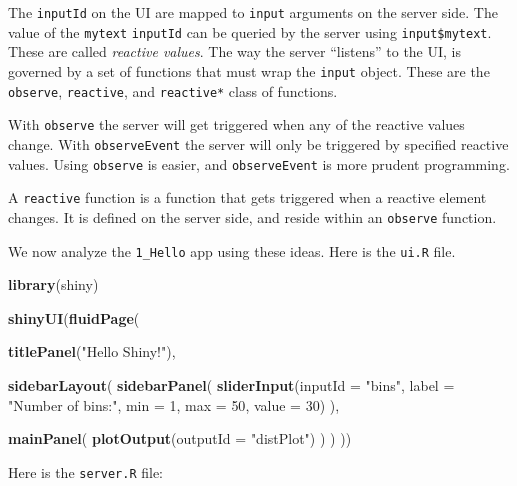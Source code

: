 \documentclass[]{book}
\newenvironment{Shaded}{\begin{snugshade}}{\end{snugshade}}
\newcommand{\DataTypeTok}[1]{\textcolor[rgb]{0.13,0.29,0.53}{#1}}
\newcommand{\DecValTok}[1]{\textcolor[rgb]{0.00,0.00,0.81}{#1}}
\newcommand{\KeywordTok}[1]{\textcolor[rgb]{0.13,0.29,0.53}{\textbf{#1}}}
\newcommand{\NormalTok}[1]{#1}
\newcommand{\StringTok}[1]{\textcolor[rgb]{0.31,0.60,0.02}{#1}}
\theoremstyle{definition}
\theoremstyle{definition}
\theoremstyle{definition}
\theoremstyle{remark}
\begin{document}
The \texttt{inputId} on the UI are mapped to \texttt{input} arguments on the server side.
The value of the \texttt{mytext} \texttt{inputId} can be queried by the server using \texttt{input\$mytext}.
These are called \emph{reactive values}.
The way the server ``listens'' to the UI, is governed by a set of functions that must wrap the \texttt{input} object.
These are the \texttt{observe}, \texttt{reactive}, and \texttt{reactive*} class of functions.

With \texttt{observe} the server will get triggered when any of the reactive values change.
With \texttt{observeEvent} the server will only be triggered by specified reactive values.
Using \texttt{observe} is easier, and \texttt{observeEvent} is more prudent programming.

A \texttt{reactive} function is a function that gets triggered when a reactive element changes.
It is defined on the server side, and reside within an \texttt{observe} function.

We now analyze the \texttt{1\_Hello} app using these ideas.
Here is the \texttt{ui.R} file.

\begin{Shaded}
\begin{Highlighting}[]
\KeywordTok{library}\NormalTok{(shiny)}

\KeywordTok{shinyUI}\NormalTok{(}\KeywordTok{fluidPage}\NormalTok{(}

  \KeywordTok{titlePanel}\NormalTok{(}\StringTok{"Hello Shiny!"}\NormalTok{),}

  \KeywordTok{sidebarLayout}\NormalTok{(}
    \KeywordTok{sidebarPanel}\NormalTok{(}
      \KeywordTok{sliderInput}\NormalTok{(}\DataTypeTok{inputId =} \StringTok{"bins"}\NormalTok{,}
                  \DataTypeTok{label =} \StringTok{"Number of bins:"}\NormalTok{, }
                  \DataTypeTok{min =} \DecValTok{1}\NormalTok{,}
                  \DataTypeTok{max =} \DecValTok{50}\NormalTok{,}
                  \DataTypeTok{value =} \DecValTok{30}\NormalTok{)}
\NormalTok{    ),}

    \KeywordTok{mainPanel}\NormalTok{(}
      \KeywordTok{plotOutput}\NormalTok{(}\DataTypeTok{outputId =} \StringTok{"distPlot"}\NormalTok{)}
\NormalTok{    )}
\NormalTok{  )}
\NormalTok{))}
\end{Highlighting}
\end{Shaded}

Here is the \texttt{server.R} file:
\end{document}
